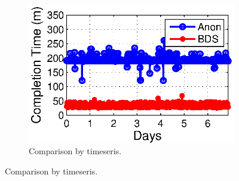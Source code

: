\begin{figure}[t]
\begin{subfigure}[b]{0.3\textwidth}
                \includegraphics[width=\textwidth]{images/BDSvsAnon_time.eps}
                \caption{Comparison by timeseris.}
                \label{fig:BDSvsAnon:time}
        \end{subfigure}
        \label{fig:BDSvsAnon}
\vspace{-0.4cm}
\end{figure}



